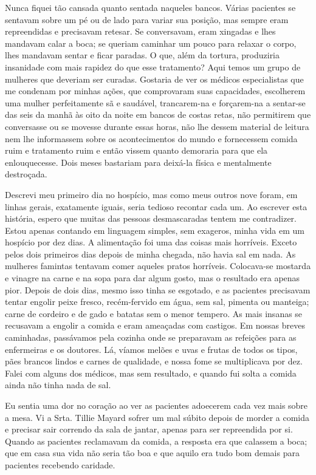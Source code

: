 Nunca fiquei tão cansada quanto sentada naqueles bancos. Várias
pacientes se sentavam sobre um pé ou de lado para variar sua posição,
mas sempre eram repreendidas e precisavam retesar. Se conversavam, eram
xingadas e lhes mandavam calar a boca; se queriam caminhar um pouco para
relaxar o corpo, lhes mandavam sentar e ficar paradas. O que, além da
tortura, produziria insanidade com mais rapidez do que esse tratamento?
Aqui temos um grupo de mulheres que deveriam ser curadas. Gostaria de
ver os médicos especialistas que me condenam por minhas ações, que
comprovaram suas capacidades, escolherem uma mulher perfeitamente sã e
saudável, trancarem-na e forçarem-na a sentar-se das seis da manhã às
oito da noite em bancos de costas retas, não permitirem que conversasse
ou se movesse durante essas horas, não lhe dessem material de leitura
nem lhe informassem sobre os acontecimentos do mundo e fornecessem
comida ruim e tratamento ruim e então vissem quanto demoraria para que
ela enlouquecesse. Dois meses bastariam para deixá-la física e
mentalmente destroçada.

Descrevi meu primeiro dia no hospício, mas como meus outros nove foram,
em linhas gerais, exatamente iguais, seria tedioso recontar cada um. Ao
escrever esta história, espero que muitas das pessoas desmascaradas
tentem me contradizer. Estou apenas contando em linguagem simples, sem
exageros, minha vida em um hospício por dez dias. A alimentação foi uma
das coisas mais horríveis. Exceto pelos dois primeiros dias depois de
minha chegada, não havia sal em nada. As mulheres famintas tentavam
comer aqueles pratos horríveis. Colocava-se mostarda e vinagre na carne
e na sopa para dar algum gosto, mas o resultado era apenas pior. Depois
de dois dias, mesmo isso tinha se esgotado, e as pacientes precisavam
tentar engolir peixe fresco, recém-fervido em água, sem sal, pimenta ou
manteiga; carne de cordeiro e de gado e batatas sem o menor tempero. As
mais insanas se recusavam a engolir a comida e eram ameaçadas com
castigos. Em nossas breves caminhadas, passávamos pela cozinha onde se
preparavam as refeições para as enfermeiras e os doutores. Lá, víamos
melões e uvas e frutas de todos os tipos, pães brancos lindos e carnes
de qualidade, e nossa fome se multiplicava por dez. Falei com alguns dos
médicos, mas sem resultado, e quando fui solta a comida ainda não tinha
nada de sal.

Eu sentia uma dor no coração ao ver as pacientes adoecerem cada vez mais
sobre a mesa. Vi a Srta. Tillie Mayard sofrer um mal súbito depois de
morder a comida e precisar sair correndo da sala de jantar, apenas para
ser repreendida por si. Quando as pacientes reclamavam da comida, a
resposta era que calassem a boca; que em casa sua vida não seria tão boa
e que aquilo era tudo bom demais para pacientes recebendo caridade.

